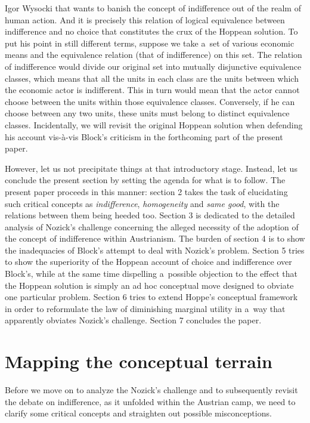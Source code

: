 \begin{artengenv}{Igor Wysocki}
\parencite*[][]{hoppe_must_2005} %
 that wants to banish the concept of indifference out of the realm of human action. And it is precisely this relation of logical equivalence between indifference and no choice that constitutes the crux of the Hoppean 
\parencite*[][]{hoppe_must_2005} %
 solution. To put his point in still different terms, suppose we take a~set of various economic means and the equivalence relation (that of indifference) on this set. The relation of indifference would divide our original set into mutually disjunctive equivalence classes, which means that all the units in each class are the units between which the economic actor is indifferent. This in turn would mean that the actor cannot choose between the units within those equivalence classes. Conversely, if he can choose between any two units, these units must belong to distinct equivalence classes. Incidentally, we will revisit the original Hoppean solution when defending his account vis-à-vis Block's criticism in the forthcoming part of the present paper.

However, let us not precipitate things at that introductory stage. Instead, let us conclude the present section by setting the agenda for what is to follow. The present paper proceeds in this manner: section 2 takes the task of elucidating such critical concepts as \textit{indifference}, \textit{homogeneity} and \textit{same good}, with the relations between them being heeded too. Section 3 is dedicated to the detailed analysis of Nozick's challenge concerning the alleged necessity of the adoption of the concept of indifference within Austrianism. The burden of section 4 is to show the inadequacies of Block's attempt to deal with Nozick's problem. Section 5 tries to show the superiority of the Hoppean account of choice and indifference over Block's, while at the same time dispelling a~possible objection to the effect that the Hoppean solution is simply an ad hoc conceptual move designed to obviate one particular problem. Section 6 tries to extend Hoppe's conceptual framework in order to reformulate the law of diminishing marginal utility in a~way that apparently obviates Nozick's challenge. Section 7 concludes the paper.

\section{Mapping the conceptual terrain}
Before we move on to analyze the Nozick's challenge and to subsequently revisit the debate on indifference, as it unfolded within the Austrian camp, we need to clarify some critical concepts and straighten out possible misconceptions.


\end{artengenv}
